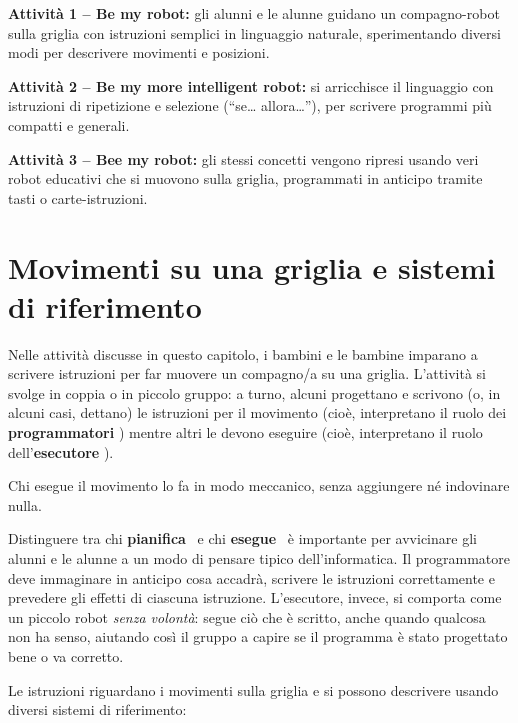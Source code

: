 \textbf{Attività 1 -- Be my robot:} gli alunni e le alunne guidano un compagno-robot sulla griglia con istruzioni semplici in linguaggio naturale, sperimentando diversi modi per descrivere movimenti e posizioni.

\textbf{Attività 2 -- Be my more intelligent robot:} si arricchisce il linguaggio con istruzioni di ripetizione e selezione (``se\ldots{} allora\ldots''), per scrivere programmi più compatti e generali.

\textbf{Attività 3 -- Bee my robot:} gli stessi concetti vengono ripresi usando veri robot educativi che si muovono sulla griglia, programmati in anticipo tramite tasti o carte-istruzioni.

\section{Movimenti su una griglia e sistemi di riferimento }\label{movimenti-su-una-griglia-e-sistemi-di-riferimento}

Nelle attività discusse in questo capitolo, i bambini e le bambine imparano a scrivere istruzioni per far muovere un compagno/a su una griglia. L'attività si svolge in coppia o in piccolo gruppo: a turno, alcuni progettano e scrivono (o, in alcuni casi, dettano) le istruzioni per il movimento (cioè, interpretano il ruolo dei \textbf{programmatori} \guideiconProgrammatore) mentre altri le devono eseguire (cioè, interpretano il ruolo dell'\textbf{esecutore} \guideiconEsecutore).

Chi esegue il movimento lo fa in modo meccanico, senza aggiungere né indovinare nulla.

\begin{attenzione}\label{aspetto-a-cui-fare-attenzione}


Distinguere tra chi \textbf{pianifica} \guideiconProgrammatore\ e chi \textbf{esegue} \guideiconEsecutore\ è importante per avvicinare gli alunni e le alunne a un modo di pensare tipico dell'informatica. Il programmatore deve immaginare in anticipo cosa accadrà, scrivere le istruzioni correttamente e prevedere gli effetti di ciascuna istruzione. L'esecutore, invece, si comporta come un piccolo robot \emph{senza volontà}: segue ciò che è scritto, anche quando qualcosa non ha senso, aiutando così il gruppo a capire se il programma è stato progettato bene o va corretto.
\end{attenzione}


Le istruzioni riguardano i movimenti sulla griglia e si possono descrivere usando diversi sistemi di riferimento:

